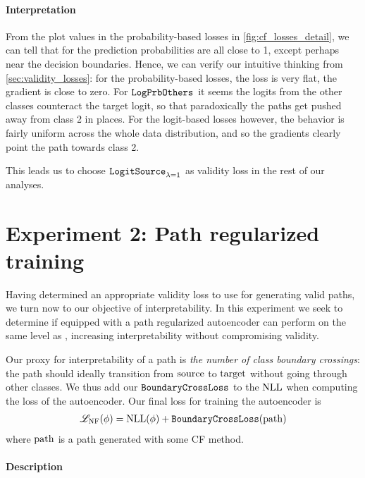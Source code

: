 \documentclass[../main.tex]{subfiles}
\begin{document}
\paragraph{Interpretation}

From the plot values in the probability-based losses in \autoref{fig:cf_losses_detail}, we can tell that for \CakeOnSea{} the prediction probabilities are all close to 1, except perhaps near the decision boundaries.
Hence, we can verify our intuitive thinking from \autoref{sec:validity_losses}: for the probability-based losses, the loss is very flat, \ie{} the gradient is close to zero.
For $\mathtt{LogPrbOthers}_{}$ it seems the logits from the other classes counteract the target logit, so that paradoxically the paths get pushed away from class 2 in places.
For the logit-based losses however, the behavior is fairly uniform across the whole data distribution, and so the gradients clearly point the path towards class 2.

This leads us to choose $\mathtt{LogitSource}_{\lambda=1}$ as validity loss in the rest of our analyses.

\section{Experiment 2: Path regularized training}
\label{exp/path_reg}

Having determined an appropriate validity loss to use for generating valid paths, we turn now to our objective of interpretability.
In this experiment we seek to determine if \ls{} equipped with a path regularized autoencoder can perform on the same level as \revise{}, increasing interpretability without compromising validity.

Our proxy for interpretability of a path is \emph{the number of class boundary crossings}:
the path should ideally transition from $\mathrm{source}$ to $\mathrm{target}$ without going through other classes.
We thus add our $\mathtt{BoundaryCrossLoss}$ to the $\text{NLL}$ when computing the loss of the autoencoder.
Our final loss for training the autoencoder is
\begin{align*}
    \mathscr{L}_\text{NF}(\phi) = \text{NLL}(\phi) + \mathtt{BoundaryCrossLoss}(\mathrm{path})
\end{align*}
where $\mathrm{path}$ is a path generated with some CF method.


\paragraph{Description}
\end{document}
